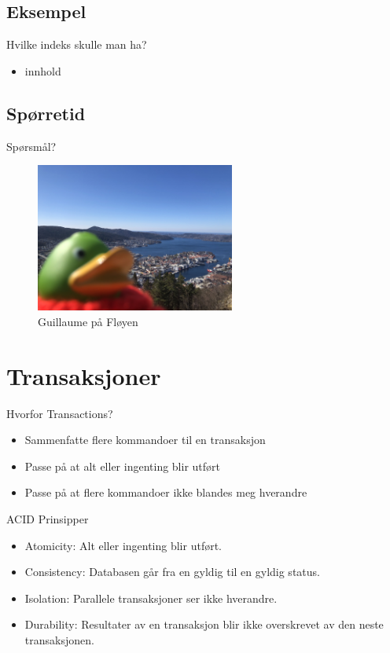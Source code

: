\subsection*{Eksempel}
\begin{frame}{Hvilke indeks skulle man ha?}
    \begin{itemize}
        \item innhold
    \end{itemize}
\end{frame}

\subsection*{Spørretid}
\begin{frame}{Spørsmål?}
    \begin{figure}
        \centering
        \includegraphics[height = 4.9cm]{images/guillaume10.jpg}
        \caption{Guillaume på Fløyen}
        \label{fig:guillaume10}
    \end{figure}
\end{frame}


\section{Transaksjoner}
\begin{frame}{Hvorfor Transactions?}
    \begin{itemize}
        \item Sammenfatte flere kommandoer til en transaksjon
        \item Passe på at alt eller ingenting blir utført
        \item Passe på at flere kommandoer ikke blandes meg hverandre
    \end{itemize}
\end{frame}

\begin{frame}{ACID Prinsipper}
    \begin{itemize}
        \item Atomicity: Alt eller ingenting blir utført.
        \item Consistency: Databasen går fra en gyldig til en gyldig status.
        \item Isolation: Parallele transaksjoner ser ikke hverandre.
        \item Durability: Resultater av en transaksjon blir ikke overskrevet av den neste transaksjonen.
    \end{itemize}
\end{frame}

